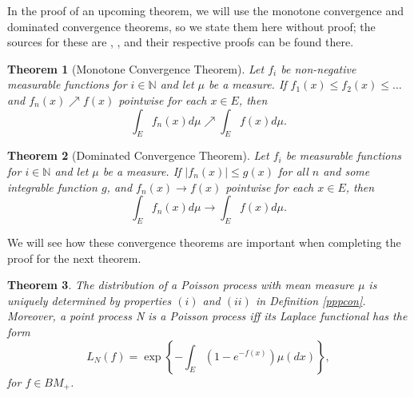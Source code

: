 \documentclass[11pt, oneside]{article}   	%
\newtheorem{theorem}{Theorem}[section]
\theoremstyle{definition}
\theoremstyle{remark}
\begin{document}
In the proof of an upcoming theorem, we will use the monotone convergence and dominated convergence theorems, so we state them here without proof; the sources for these are \cite{monotone2026}, \cite{dominated2026}, and their respective proofs can be found there. 

\begin{theorem}[Monotone Convergence Theorem]
  Let $f_i$ be non-negative measurable functions for $i \in \mathbb{N}$ and let $\mu$ be a measure. If $f_1(x) \leq f_2(x) \leq \dots$ and $f_n(x) \nearrow f(x)$ pointwise for each $x \in E$, then $$\int_{E} f_n(x) d\mu \nearrow \int_{E} f(x) d\mu.$$
\end{theorem}

\begin{theorem}[Dominated Convergence Theorem]
  Let $f_i$ be measurable functions for $i \in \mathbb{N}$ and let $\mu$ be a measure. If $|f_n(x)| \leq g(x)$ for all $n$ and some integrable function $g$, and $f_n(x) \to f(x)$ pointwise for each $x \in E$, then $$\int_{E} f_n(x) d\mu \to \int_{E} f(x) d\mu.$$
\end{theorem}

We will see how these convergence theorems are important when completing the proof for the next theorem.

\begin{theorem} \label{uniquepp}
  The distribution of a Poisson process with mean measure $\mu$ is uniquely determined by properties $(i)$ and $(ii)$ in Definition \ref{pppcon}. Moreover, a point process N is a Poisson process iff its Laplace functional has the form
  \begin{equation} \label{laplacefuncpp}
    L_N(f) = \exp \left\{ -\int_{E}(1-e^{-f(x)})\mu (dx) \right\},
  \end{equation}
  for $f \in BM_+$.
\end{theorem}
\end{document}
